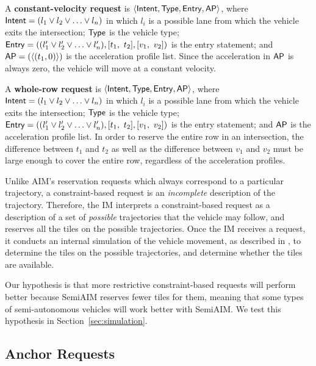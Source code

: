 \begin{small_ind_s_itemize}
\item A \textbf{constant-velocity request}
is $\langle {\sf Intent}, {\sf Type}, {\sf Entry}, {\sf AP} \rangle$,
where
${\sf Intent} = ( l_1 \vee l_2 \vee \ldots \vee l_n )$
in which $l_i$ is a possible lane from which the vehicle 
exits the intersection;
${\sf Type}$ is the vehicle type;
${\sf Entry} = (( l'_1 \vee l'_2 \vee \ldots \vee l'_n ), [t_1,\ t_2], [v_1,\ v_2])$
is the entry statement; and
${\sf AP} = ( \langle (t_1, 0) \rangle )$
is the acceleration profile list.
Since the acceleration in ${\sf AP}$
is always zero, the vehicle will move at a constant velocity.

\item A \textbf{whole-row request}
is $\langle {\sf Intent}, {\sf Type}, {\sf Entry}, {\sf AP} \rangle$,
where
${\sf Intent} = ( l_1 \vee l_2 \vee \ldots \vee l_n )$
in which $l_i$ is a possible lane from which the vehicle 
exits the intersection;
${\sf Type}$ is the vehicle type;
${\sf Entry} = (( l'_1 \vee l'_2 \vee \ldots \vee l'_n ), [t_1,\ t_2], [v_1,\ v_2])$
is the entry statement; and
${\sf AP}$ is the acceleration profile list.
In order to reserve the entire row in an intersection,
the difference between $t_1$ and $t_2$ 
as well as the difference between $v_1$ and $v_2$
must be large enough to cover the entire row,
regardless of the acceleration profiles.
\end{small_ind_s_itemize}

Unlike AIM's reservation requests which always correspond to a
particular trajectory, a constraint-based request is an
\emph{incomplete} description of the trajectory.  Therefore, the IM
interprets a constraint-based request as a description of a set of
\emph{possible} trajectories that the vehicle may follow, and reserves
all the tiles on the possible trajectories.  Once the IM receives a
request, it conducts an internal simulation of the vehicle
movement, as described in \cite{bib:Dresner08Multiagent}, to determine
the tiles on the possible trajectories, and determine whether the
tiles are available.

Our hypothesis is that more restrictive constraint-based requests 
will perform better because SemiAIM reserves fewer tiles for them,
meaning that some types of semi-autonomous vehicles will work better
with SemiAIM.  We test this hypothesis in
Section~\ref{sec:simulation}.

\subsection{Anchor Requests}
\label{sec:anchor}

